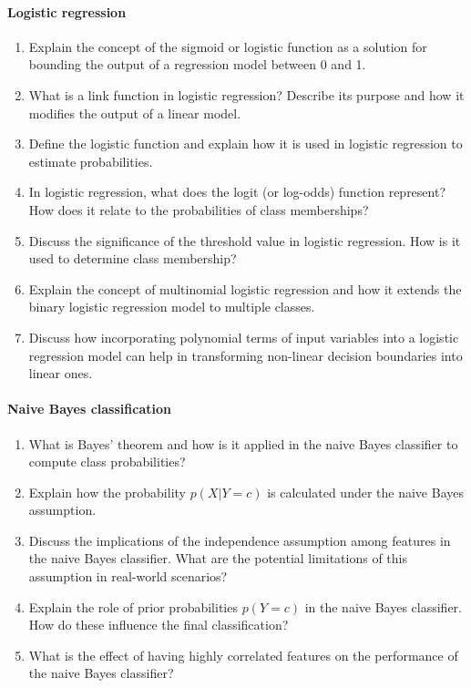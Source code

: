 \paragraph*{Logistic regression}
\begin{enumerate}
  \item Explain the concept of the sigmoid or logistic function as a solution for bounding the output of a regression model between 0 and 1.
  \item What is a link function in logistic regression? Describe its purpose and how it modifies the output of a linear model.
  \item Define the logistic function and explain how it is used in logistic regression to estimate probabilities.
  \item In logistic regression, what does the logit (or log-odds) function represent? How does it relate to the probabilities of class memberships?
  \item Discuss the significance of the threshold value in logistic regression. How is it used to determine class membership?
  \item Explain the concept of multinomial logistic regression and how it extends the binary logistic regression model to multiple classes.
  \item Discuss how incorporating polynomial terms of input variables into a logistic regression model can help in transforming non-linear decision boundaries into linear ones.
\end{enumerate}
\begin{advanced}
\paragraph*{Naive Bayes classification}
\begin{enumerate}
  \item What is Bayes' theorem and how is it applied in the naive Bayes classifier to compute class probabilities?
  \item Explain how the probability $p(X|Y=c)$ is calculated under the naive Bayes assumption.
  \item Discuss the implications of the independence assumption among features in the naive Bayes classifier. What are the potential limitations of this assumption in real-world scenarios?
  \item Explain the role of prior probabilities $p(Y=c)$ in the naive Bayes classifier. How do these influence the final classification?
  \item What is the effect of having highly correlated features on the performance of the naive Bayes classifier?
\end{enumerate}
\end{advanced}
